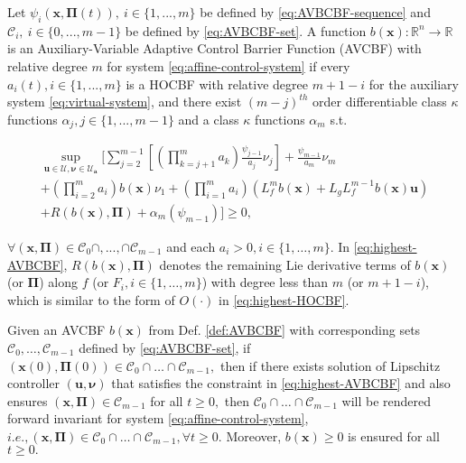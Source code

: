 \begin{definition}[AVCBF]
\label{def:AVBCBF}
Let $\psi_{i}(\boldsymbol{x},\boldsymbol{\Pi}(t)),\ i\in \{1,...,m\}$ be defined by \eqref{eq:AVBCBF-sequence} and $\mathcal C_{i},\ i\in \{0,...,m-1\}$ be defined by \eqref{eq:AVBCBF-set}. A function $b(\boldsymbol{x}):\mathbb{R}^{n}\to\mathbb{R}$ is an Auxiliary-Variable Adaptive Control Barrier Function (AVCBF) with relative degree $m$ for system \eqref{eq:affine-control-system} if every $a_{i}(t),i\in \{1,...,m\}$ is a
HOCBF with relative degree $m+1-i$ for the auxiliary system
\eqref{eq:virtual-system}, and there exist $(m-j)^{th}$ order differentiable class $\kappa$ functions $\alpha_{j},j\in \{1,...,m-1\}$
and a class $\kappa$ functions $\alpha_{m}$ s.t.
\begin{small}
\begin{equation}
\label{eq:highest-AVBCBF}
\begin{split}
\sup_{\boldsymbol{u}\in \mathcal{U},\boldsymbol{\nu}\in \mathcal{U}_{\boldsymbol{a}}}[\sum_{j=2}^{m-1}[(\prod_{k=j+1}^{m}a_{k})\frac{\psi_{j-1}}{a_{j}}\nu_{j}] + \frac{\psi_{m-1}}{a_{m}}\nu_{m} \\ +(\prod_{i=2}^{m}a_{i})b(\boldsymbol{x})\nu_{1} +(\prod_{i=1}^{m}a_{i})(L_{f}^{m}b(\boldsymbol{x})+L_{g}L_{f}^{m-1}b(\boldsymbol{x})\boldsymbol{u})\\+R(b(\boldsymbol{x}),\boldsymbol{\Pi})
+ \alpha_{m}(\psi_{m-1})] \ge 0,
\end{split}
\end{equation}
\end{small}
$\forall (\boldsymbol{x},\boldsymbol{\Pi})\in \mathcal C_{0}\cap,...,\cap \mathcal C_{m-1}$ and each $a_{i}>0, i\in\{1,\dots,m\}.$ In \eqref{eq:highest-AVBCBF}, $R(b(\boldsymbol{x}),\boldsymbol{\Pi})$ denotes the remaining Lie derivative terms of $b(\boldsymbol{x})$ (or $\boldsymbol{\Pi}$) along $f$ (or $F_{i},i\in\{1,\dots,m\}$) with degree less than $m$ (or $m+1-i$), which is similar to the form of $O(\cdot )$ in \eqref{eq:highest-HOCBF}.
\end{definition}

\begin{theorem}
\label{thm:safety-guarantee-3}
Given an AVCBF $b(\boldsymbol{x})$ from Def. \ref{def:AVBCBF} with corresponding sets $\mathcal{C}_{0}, \dots,\mathcal {C}_{m-1}$ defined by \eqref{eq:AVBCBF-set}, if $(\boldsymbol{x}(0),\boldsymbol{\Pi}(0)) \in \mathcal {C}_{0}\cap \dots \cap \mathcal {C}_{m-1},$ then if there exists solution of Lipschitz controller $(\boldsymbol{u},\boldsymbol{\nu})$ that satisfies the constraint in \eqref{eq:highest-AVBCBF} and also ensures $(\boldsymbol{x},\boldsymbol{\Pi})\in \mathcal {C}_{m-1}$ for all $t\ge 0,$ then $\mathcal {C}_{0}\cap \dots \cap \mathcal {C}_{m-1}$ will be rendered forward invariant for system \eqref{eq:affine-control-system}, $i.e., (\boldsymbol{x},\boldsymbol{\Pi}) \in \mathcal {C}_{0}\cap \dots \cap \mathcal {C}_{m-1}, \forall t\ge 0.$ Moreover, $b(\boldsymbol{x})\ge 0$ is ensured for all $t\ge 0.$
\end{theorem}

